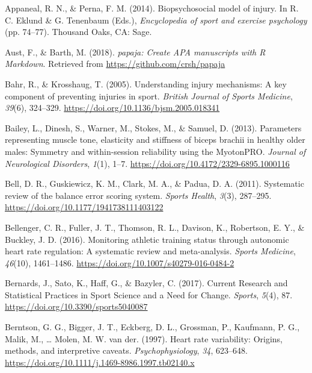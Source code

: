 \documentclass[
  english,
  man,floatsintext]{apa6}
\begin{document}
\leavevmode\hypertarget{ref-Appaneal2014}{}%
Appaneal, R. N., \& Perna, F. M. (2014). Biopsychosocial model of injury. In R. C. Eklund \& G. Tenenbaum (Eds.), \emph{Encyclopedia of sport and exercise psychology} (pp. 74--77). Thousand Oaks, CA: Sage.

\leavevmode\hypertarget{ref-R-papaja}{}%
Aust, F., \& Barth, M. (2018). \emph{papaja: Create APA manuscripts with R Markdown}. Retrieved from \url{https://github.com/crsh/papaja}

\leavevmode\hypertarget{ref-Bahr2005}{}%
Bahr, R., \& Krosshaug, T. (2005). Understanding injury mechanisms: A key component of preventing injuries in sport. \emph{British Journal of Sports Medicine}, \emph{39}(6), 324--329. \url{https://doi.org/10.1136/bjsm.2005.018341}

\leavevmode\hypertarget{ref-Bailey2013}{}%
Bailey, L., Dinesh, S., Warner, M., Stokes, M., \& Samuel, D. (2013). Parameters representing muscle tone, elasticity and stiffness of biceps brachii in healthy older males: Symmetry and within-session reliability using the MyotonPRO. \emph{Journal of Neurological Disorders}, \emph{1}(1), 1--7. \url{https://doi.org/10.4172/2329-6895.1000116}

\leavevmode\hypertarget{ref-Bell2011}{}%
Bell, D. R., Guskiewicz, K. M., Clark, M. A., \& Padua, D. A. (2011). Systematic review of the balance error scoring system. \emph{Sports Health}, \emph{3}(3), 287--295. \url{https://doi.org/10.1177/1941738111403122}

\leavevmode\hypertarget{ref-Bellenger2016}{}%
Bellenger, C. R., Fuller, J. T., Thomson, R. L., Davison, K., Robertson, E. Y., \& Buckley, J. D. (2016). Monitoring athletic training status through autonomic heart rate regulation: A systematic review and meta-analysis. \emph{Sports Medicine}, \emph{46}(10), 1461--1486. \url{https://doi.org/10.1007/s40279-016-0484-2}

\leavevmode\hypertarget{ref-Bernards2017}{}%
Bernards, J., Sato, K., Haff, G., \& Bazyler, C. (2017). Current Research and Statistical Practices in Sport Science and a Need for Change. \emph{Sports}, \emph{5}(4), 87. \url{https://doi.org/10.3390/sports5040087}

\leavevmode\hypertarget{ref-Berntson1997}{}%
Berntson, G. G., Bigger, J. T., Eckberg, D. L., Grossman, P., Kaufmann, P. G., Malik, M., \ldots{} Molen, M. W. van der. (1997). Heart rate variability: Origins, methods, and interpretive caveats. \emph{Psychophysiology}, \emph{34}, 623--648. \url{https://doi.org/10.1111/j.1469-8986.1997.tb02140.x}
\end{document}
